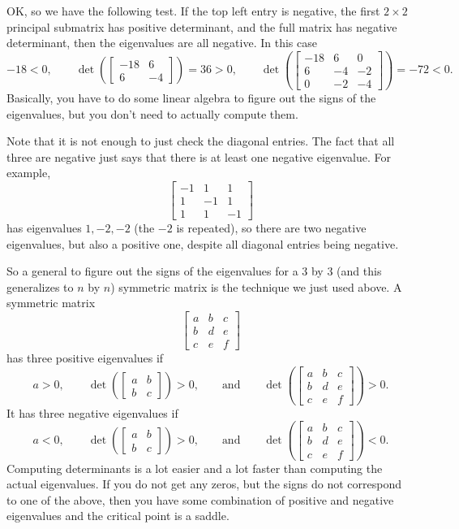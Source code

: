 \documentclass[12pt]{article}
\begin{document}
OK, so we have the following test.
If the top left
entry is negative, the first $2 \times 2$ principal submatrix has positive
determinant, and the full matrix has negative determinant, then the
eigenvalues are all negative.  In this case 
\[
-18 < 0,
\qquad
\det \left(
\begin{bmatrix}
-18 & 6 \\
6 & -4
\end{bmatrix}
\right) = 36 > 0 ,
\qquad
\det \left(
\begin{bmatrix}
-18 & 6 & 0 \\
6 & -4 & -2 \\
0 & -2 & -4
\end{bmatrix}
\right) = -72 < 0 .
\]
Basically, you have to do some linear algebra to figure
out the signs of the eigenvalues, but you don't need to
actually compute them.

Note that it is not enough to just check the diagonal entries.  The fact
that all three are negative just says that there is at least one negative
eigenvalue.  For example, 
\[
\begin{bmatrix}
-1 & 1 & 1 \\
1 & -1 & 1 \\
1 & 1 & -1
\end{bmatrix}
\]
has eigenvalues $1,-2,-2$ (the $-2$ is repeated), so there are two negative
eigenvalues, but also a positive one, despite all diagonal entries being
negative.

So a general to figure out the signs of the eigenvalues for
a 3 by 3 (and this generalizes to $n$ by $n$) symmetric matrix is
the technique we just used above.
A symmetric matrix
\[
\begin{bmatrix}
a & b & c \\
b & d & e \\
c & e & f
\end{bmatrix}
\]
has 
three positive eigenvalues if
\[
a > 0,
\qquad
\det \left(
\begin{bmatrix}
a & b \\
b & c
\end{bmatrix}
\right) > 0 ,
\qquad \text{and} \qquad
\det \left(
\begin{bmatrix}
a & b & c \\
b & d & e \\
c & e & f
\end{bmatrix}
\right) > 0 .
\]
It has three negative eigenvalues if
\[
a < 0,
\qquad
\det \left(
\begin{bmatrix}
a & b \\
b & c
\end{bmatrix}
\right) > 0 ,
\qquad \text{and} \qquad
\det \left(
\begin{bmatrix}
a & b & c \\
b & d & e \\
c & e & f
\end{bmatrix}
\right) < 0 .
\]
Computing determinants is a lot easier and a lot faster than computing the
actual eigenvalues.
If you do not get any zeros, but the signs do not correspond to one of the
above, then you have some combination of positive and negative eigenvalues
and the critical point is a saddle.
\end{document}
